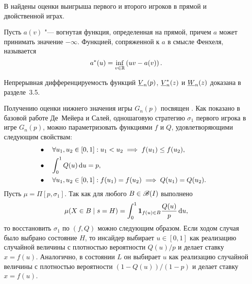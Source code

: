 В  найдены оценки выигрыша первого и второго игроков в прямой и двойственной играх.

Пусть $a(v)$ "--- вогнутая функция, определенная на прямой, причем $a$ может принимать значение $-\infty$.
Функцией, сопряженной к $a$ в смысле Фенхеля, называется
\begin{equation*}
  a^*(u) = \inf_{v \in \mathbb{R}} \left( u v - a(v) \right).
\end{equation*}

Непрерывная дифференцируемость функций $\LV{n}(p)$, $\LV[*]{n}(z)$ и $\LW{n}(z)$ доказана в разделе~3.5.

Получению оценки нижнего значения игры $G_n(p)$ посвящен .
Как показано в базовой работе Де~Мейера и Салей, одношаговую стратегию $\sigma_1$ первого игрока в игре $G_n(p)$, можно параметризовать функциями $f$ и $Q$, удовлетворяющими следующим свойствам:
\begin{subequations}
  \begin{flalign}
    \label{ch3:eq:parametr-prop:f-incr}
    &\bullet\quad \forall u_1, u_2 \in [0, 1]: u_1 < u_2 \implies f(u_1) \leq f(u_2),&\\
    \label{ch3:eq:parametr-prop:int-q=p}
    &\bullet\quad \int_0^1 Q(u) \mathop{}\!\mathrm{d} u = p,&\\
    \label{ch3:eq:parametr-prop:f-Q-eq}
    &\bullet\quad \forall u_1, u_2 \in [0, 1]: f(u_1) = f(u_2) \implies Q(u_1) = Q(u_2).&
  \end{flalign}
\end{subequations}
Пусть $\mu = \Pi[p, \sigma_1]$.
Так как для любого $B \in \mathscr{B}(I)$ выполнено
\begin{equation*}
  \mu(X \in B \; | \; s = H) = \int_0^1 \mathbf{1}_{f(u) \in B} \frac{Q(u)}{p} \mathop{}\!\mathrm{d} u,
\end{equation*}
то восстановить $\sigma_1$ по $(f, Q)$ можно следующим образом.
Если ходом случая было выбрано состояние $H$, то инсайдер выбирает $u \in [0, 1]$ как реализацию случайной величины с плотностью вероятности $Q(u)/p$ и делает ставку $x = f(u)$.
Аналогично, в состоянии $L$ он выбирает $u$ как реализацию случайной величины с плотностью вероятности $(1 - Q(u))/(1 - p)$ и делает ставку $x = f(u)$.

